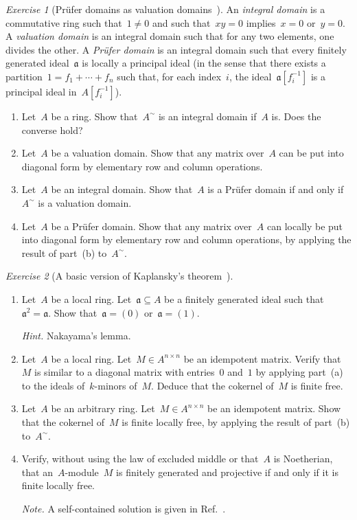 \documentclass[10pt,reqno,a4paper,openany]{amsbook}
\theoremstyle{definition}
\theoremstyle{plain}
\theoremstyle{remark}
\newcommand{\aaa}{\mathfrak{a}}
\newcommand{\?}{\,{:}\,}
\renewcommand{\_}{\mathpunct{.}\,}
\newtheorem{exercise}{Exercise}[chapter]
\begin{document}
\begin{exercise}[{Prüfer domains as valuation domains~\cite[Exercise~43]{blechschmidt:generalized-spaces}}]
An \emph{integral domain} is a commutative ring such that~$1 \neq 0$ and such that~$xy = 0$
implies~$x = 0$ or~$y = 0$. A \emph{valuation domain} is an integral domain
such that for any two elements, one divides the other. A \emph{Prüfer domain}
is an integral domain such that every finitely generated ideal~$\aaa$ is locally a
principal ideal (in the sense that there exists a partition~$1 = f_1 + \cdots +
f_n$ such that, for each index~$i$, the ideal~$\aaa[f_i^{-1}]$ is a principal
ideal in~$A[f_i^{-1}]$).
\begin{enumerate}
\item Let~$A$ be a ring. Show that~$A^\sim$ is an integral domain if~$A$ is.
Does the converse hold?
\item Let~$A$ be a valuation domain. Show that any matrix over~$A$ can be put
into diagonal form by elementary row and column operations.
\item Let~$A$ be an integral domain. Show that~$A$ is a Prüfer domain if and
only if~$A^\sim$ is a valuation domain.
\item Let~$A$ be a Prüfer domain. Show that any matrix over~$A$ can locally be
put into diagonal form by elementary row and column operations, by applying the
result of part~(b) to~$A^\sim$.
\end{enumerate}
\end{exercise}

\begin{exercise}[{A basic version of Kaplansky's theorem~\cite[Exercise~44]{blechschmidt:generalized-spaces}}]
\begin{enumerate}
\item Let~$A$ be a local ring. Let~$\aaa \subseteq A$ be a finitely generated
ideal such that~$\aaa^2 = \aaa$. Show that~$\aaa = (0)$ or~$\aaa = (1)$.\smallskip

{\noindent\scriptsize\emph{Hint.} Nakayama's lemma.\par}
\item Let~$A$ be a local ring. Let~$M \in A^{n \times n}$ be an idempotent
matrix. Verify that~$M$ is similar to a diagonal matrix with entries~$0$ and~$1$
by applying part~(a) to the ideals of~$k$-minors of~$M$. Deduce that the
cokernel of~$M$ is finite free.
\item Let~$A$ be an arbitrary ring. Let~$M \in A^{n \times n}$ be an idempotent
matrix. Show that the cokernel of~$M$ is finite locally free, by applying the
result of part~(b) to~$A^\sim$.
\item Verify, without using the law of excluded middle or that~$A$ is
Noetherian, that an~$A$-module~$M$ is finitely generated and projective if and
only if it is finite locally free.\smallskip

{\noindent\scriptsize\emph{Note.} A self-contained solution is given in
Ref.~\cite{blechschmidt:kaplansky}.\par}
\end{enumerate}
\end{exercise}

\printbibliography
\end{document}
